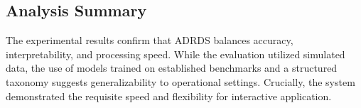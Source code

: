 \subsection{Analysis Summary}

The experimental results confirm that ADRDS balances accuracy, interpretability, and processing speed. While the evaluation utilized simulated data, the use of models trained on established benchmarks and a structured taxonomy suggests generalizability to operational settings. Crucially, the system demonstrated the requisite speed and flexibility for interactive application.
